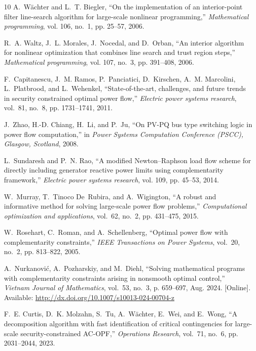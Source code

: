 \documentclass{IEEEtran4PSCC}
\begin{document}
\begin{thebibliography}{10}
A.~W{\"a}chter and L.~T. Biegler, ``On the implementation of an interior-point filter line-search algorithm for large-scale nonlinear programming,'' \emph{Mathematical programming}, vol. 106, no.~1, pp. 25--57, 2006.

R.~A. Waltz, J.~L. Morales, J.~Nocedal, and D.~Orban, ``An interior algorithm for nonlinear optimization that combines line search and trust region steps,'' \emph{Mathematical programming}, vol. 107, no.~3, pp. 391--408, 2006.

F.~Capitanescu, J.~M. Ramos, P.~Panciatici, D.~Kirschen, A.~M. Marcolini, L.~Platbrood, and L.~Wehenkel, ``State-of-the-art, challenges, and future trends in security constrained optimal power flow,'' \emph{Electric power systems research}, vol.~81, no.~8, pp. 1731--1741, 2011.

J.~Zhao, H.-D. Chiang, H.~Li, and P.~Ju, ``On {PV-PQ} bus type switching logic in power flow computation,'' in \emph{Power Systems Computation Conference (PSCC), Glasgow, Scotland}, 2008.

L.~Sundaresh and P.~N. Rao, ``A modified {N}ewton--{R}aphson load flow scheme for directly including generator reactive power limits using complementarity framework,'' \emph{Electric power systems research}, vol. 109, pp. 45--53, 2014.

W.~Murray, T.~Tinoco De~Rubira, and A.~Wigington, ``A robust and informative method for solving large-scale power flow problems,'' \emph{Computational optimization and applications}, vol.~62, no.~2, pp. 431--475, 2015.

W.~Rosehart, C.~Roman, and A.~Schellenberg, ``Optimal power flow with complementarity constraints,'' \emph{IEEE Transactions on Power Systems}, vol.~20, no.~2, pp. 813--822, 2005.

\BIBentryALTinterwordspacing
A.~Nurkanović, A.~Pozharskiy, and M.~Diehl, ``Solving mathematical programs with complementarity constraints arising in nonsmooth optimal control,'' \emph{Vietnam Journal of Mathematics}, vol.~53, no.~3, p. 659–697, Aug. 2024. [Online]. Available: \url{http://dx.doi.org/10.1007/s10013-024-00704-z}
\BIBentrySTDinterwordspacing

F.~E. Curtis, D.~K. Molzahn, S.~Tu, A.~W{\"a}chter, E.~Wei, and E.~Wong, ``A decomposition algorithm with fast identification of critical contingencies for large-scale security-constrained {AC-OPF},'' \emph{Operations Research}, vol.~71, no.~6, pp. 2031--2044, 2023.


\end{thebibliography}
\end{document}
